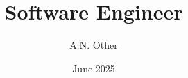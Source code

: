 \documentclass[10pt, letterpaper]{smart-cv}
\author{A.N. Other}
\title{Software Engineer}
\date{June 2025}
\begin{document}
  \begin{two-col}
    {
      \lipsum[1]
    }
    \lipsum[2-4] 
  \end{two-col}
\end{document}
